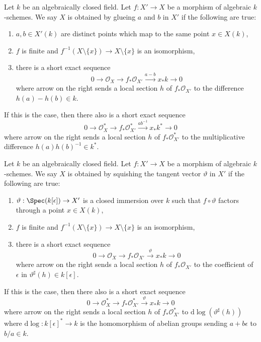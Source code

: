 \begin{example}
\label{example-glue-points}
Let $k$ be an algebraically closed field. Let $f : X' \to X$
be a morphism of algebraic $k$-schemes. We say $X$ is
obtained by glueing $a$ and $b$ in $X'$ if the following are true:
\begin{enumerate}
\item $a, b \in X'(k)$ are distinct points which map to the same
point $x \in X(k)$,
\item $f$ is finite and
$f^{-1}(X \setminus \{x\}) \to X \setminus \{x\}$ is an isomorphism,
\item there is a short exact sequence
$$
0 \to \mathcal{O}_X \to f_*\mathcal{O}_{X'} \xrightarrow{a - b} x_*k \to 0
$$
where arrow on the right sends a local section $h$ of $f_*\mathcal{O}_{X'}$
to the difference $h(a) - h(b) \in k$.
\end{enumerate}
If this is the case, then there also is a short exact sequence
$$
0 \to \mathcal{O}_X^* \to f_*\mathcal{O}_{X'}^*
\xrightarrow{ab^{-1}} x_*k^* \to 0
$$
where arrow on the right sends a local section $h$ of $f_*\mathcal{O}_{X'}^*$
to the multiplicative difference $h(a)h(b)^{-1} \in k^*$.
\end{example}

\begin{example}
\label{example-squish-tangent-vector}
Let $k$ be an algebraically closed field. Let $f : X' \to X$
be a morphism of algebraic $k$-schemes. We say $X$ is
obtained by squishing the tangent vector $\vartheta$ in $X'$
if the following are true:
\begin{enumerate}
\item $\vartheta : \Spec(k[\epsilon]) \to X'$ is a closed immersion
over $k$ such that $f \circ \vartheta$ factors through a point $x \in X(k)$,
\item $f$ is finite and
$f^{-1}(X \setminus \{x\}) \to X \setminus \{x\}$ is an isomorphism,
\item there is a short exact sequence
$$
0 \to \mathcal{O}_X \to f_*\mathcal{O}_{X'} \xrightarrow{\vartheta} x_*k \to 0
$$
where arrow on the right sends a local section $h$ of $f_*\mathcal{O}_{X'}$
to the coefficient of $\epsilon$ in $\vartheta^\sharp(h) \in k[\epsilon]$.
\end{enumerate}
If this is the case, then there also is a short exact sequence
$$
0 \to \mathcal{O}_X^* \to f_*\mathcal{O}_{X'}^*
\xrightarrow{\vartheta} x_*k \to 0
$$
where arrow on the right sends a local section $h$ of $f_*\mathcal{O}_{X'}^*$
to $\text{d}\log(\vartheta^\sharp(h))$ where
$\text{d}\log : k[\epsilon]^* \to k$
is the homomorphism of abelian groups sending $a + b\epsilon$ to $b/a \in k$.
\end{example}

